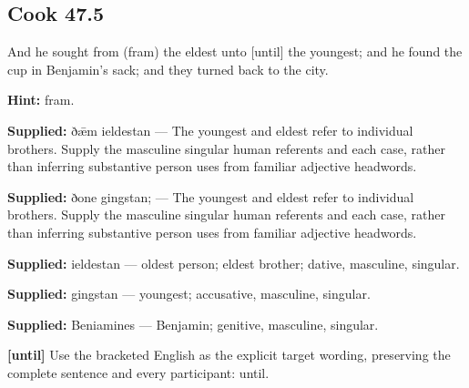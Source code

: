 \par\begin{minipage}{\linewidth}\raggedright
\subsection*{Cook 47.5}

And he sought from (fram) the eldest unto [until] the youngest; and he found the cup in Benjamin’s sack; and they turned back to the city.

\textbf{Hint:} fram.

\end{minipage}\par\addvspace{4pt}

\textbf{Supplied:} ðǣm ieldestan — The youngest and eldest refer to individual brothers. Supply the masculine singular human referents and each case, rather than inferring substantive person uses from familiar adjective headwords.

\textbf{Supplied:} ðone gingstan; — The youngest and eldest refer to individual brothers. Supply the masculine singular human referents and each case, rather than inferring substantive person uses from familiar adjective headwords.

\textbf{Supplied:} ieldestan — oldest person; eldest brother; dative, masculine, singular.

\textbf{Supplied:} gingstan — youngest; accusative, masculine, singular.

\textbf{Supplied:} Beniamines — Benjamin; genitive, masculine, singular.

\textbf{[until]} Use the bracketed English as the explicit target wording, preserving the complete sentence and every participant: until.

